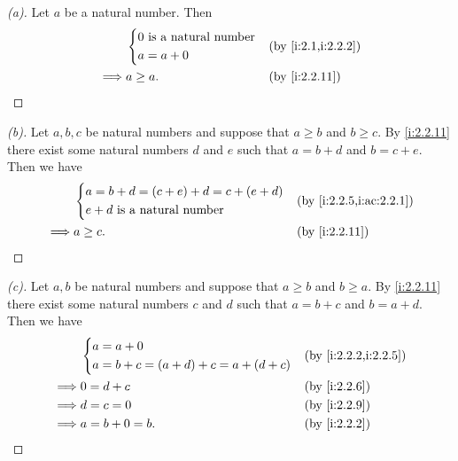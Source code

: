 \begin{proof}[(a)]
  Let \(a\) be a natural number.
  Then
  \begin{align*}
             & \begin{dcases}
                 0 \text{ is a natural number} \\
                 a = a + 0
               \end{dcases} &  & \by{i:2.1,i:2.2.2}                \\
    \implies & a \geq a.                        &  & \by{i:2.2.11}
  \end{align*}
\end{proof}

\begin{proof}[(b)]
  Let \(a, b, c\) be natural numbers and suppose that \(a \geq b\) and \(b \geq c\).
  By \cref{i:2.2.11} there exist some natural numbers \(d\) and \(e\) such that \(a = b + d\) and \(b = c + e\).
  Then we have
  \begin{align*}
             & \begin{dcases}
                 a = b + d = (c + e) + d = c + (e + d) \\
                 e + d \text{ is a natural number}
               \end{dcases} &  & \by{i:2.2.5,i:ac:2.2.1}                   \\
    \implies & a \geq c.                                &  & \by{i:2.2.11}
  \end{align*}
\end{proof}

\begin{proof}[(c)]
  Let \(a, b\) be natural numbers and suppose that \(a \geq b\) and \(b \geq a\).
  By \cref{i:2.2.11} there exist some natural numbers \(c\) and \(d\) such that \(a = b + c\) and \(b = a + d\).
  Then we have
  \begin{align*}
             & \begin{dcases}
                 a = a + 0 \\
                 a = b + c = (a + d) + c = a + (d + c)
               \end{dcases} &  & \by{i:2.2.2,i:2.2.5}                  \\
    \implies & 0 = d + c                             &  & \by{i:2.2.6} \\
    \implies & d = c = 0                             &  & \by{i:2.2.9} \\
    \implies & a = b + 0 = b.                        &  & \by{i:2.2.2}
  \end{align*}
\end{proof}

